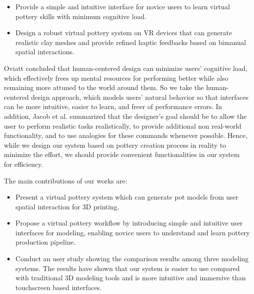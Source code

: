\documentclass{svjour3}                     %
\begin{document}
\begin{itemize}
\item Provide a simple and intuitive interface for novice users to learn virtual pottery skills with minimum cognitive load.
\item Design a robust virtual pottery system on VR devices that can generate realistic clay meshes and provide refined haptic feedbacks based on bimanual spatial interactions.
\end{itemize}

Oviatt \cite{oviatt2006human} concluded that human-centered design can minimize users’ cognitive load, which effectively frees up mental resources for performing better while also remaining more attuned to the world around them.
So we take the human-centered design approach, which models users’ natural behavior so that interfaces can be more intuitive, easier to learn, and freer of performance errors.
In addition, Jacob et al. \cite{Jacob2008Reality} summarized that the designer's goal should be to allow the user to perform realistic tasks realistically, to provide additional non real-world functionality, and to use analogies for these commands whenever possible.
Hence, while we design our system based on pottery creation process in reality to minimize the effort, we should provide convenient functionalities in our system for efficiency.

The main contributions of our works are:

\begin{itemize}
\item Present a virtual pottery system which can generate pot models from user spatial interaction for 3D printing.
\item Propose a virtual pottery workflow by introducing simple and intuitive user interfaces for modeling, enabling novice users to understand and learn pottery production pipeline.
\item Conduct an user study showing the comparison results among three modeling systems. The results have shown that our system is easier to use compared with traditional 3D modeling tools and is more intuitive and immersive than touchscreen based interfaces.
\end{itemize}
\end{document}
